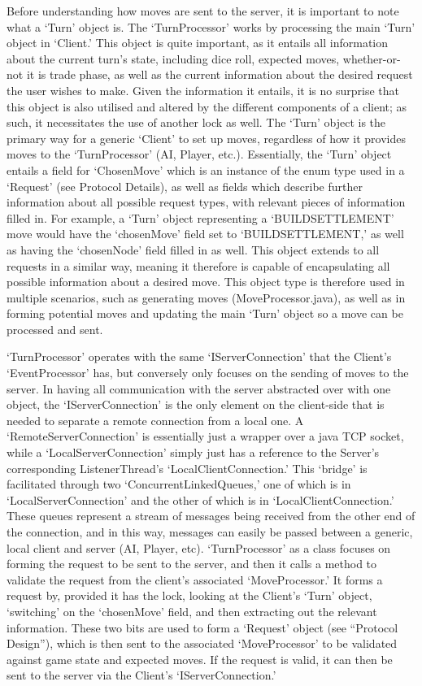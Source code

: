 \documentclass[a4paper,doc,draftfirst]{apa6}
\begin{document}
Before understanding how moves are sent to the server, it is important to note what a ‘Turn’ object is. The ‘TurnProcessor’ works by processing the main ‘Turn’ object in ‘Client.’ This object is quite important, as it entails all information about the current turn’s state, including dice roll, expected moves, whether-or-not it is trade phase, as well as the current information about the desired request the user wishes to make. Given the information it entails, it is no surprise that this object is also utilised and altered by the different components of a client; as such, it necessitates the use of another lock as well. The ‘Turn’ object is the primary way for a generic ‘Client’ to set up moves, regardless of how it provides moves to the ‘TurnProcessor’ (AI, Player, etc.). Essentially, the ‘Turn’ object entails a field for ‘ChosenMove’ which is an instance of the enum type used in a ‘Request’ (see Protocol Details), as well as fields which describe further information about all possible request types, with relevant pieces of information filled in. For example, a ‘Turn’ object representing a ‘BUILDSETTLEMENT’ move would have the ‘chosenMove’ field set to ‘BUILDSETTLEMENT,’ as well as having the ‘chosenNode’ field filled in as well. This object extends to all requests in a similar way, meaning it therefore is capable of encapsulating all possible information about a desired move. This object type is therefore used in multiple scenarios, such as generating moves (MoveProcessor.java), as well as in forming potential moves and updating the main ‘Turn’ object so a move can be processed and sent.

‘TurnProcessor’ operates with the same ‘IServerConnection’ that the Client’s ‘EventProcessor’ has, but conversely only focuses on the sending of moves to the server. In having all communication with the server abstracted over with one object, the ‘IServerConnection’ is the only element on the client-side that is needed to separate a remote connection from a local one. A ‘RemoteServerConnection’ is essentially just a wrapper over a java TCP socket, while a ‘LocalServerConnection’ simply just has a reference to the Server’s corresponding ListenerThread’s ‘LocalClientConnection.’ This ‘bridge’ is facilitated through two ‘ConcurrentLinkedQueues,’ one of which is in ‘LocalServerConnection’ and the other of which is in ‘LocalClientConnection.’ These queues represent a stream of messages being received from the other end of the connection, and in this way, messages can easily be passed between a generic, local client and server (AI, Player, etc). ‘TurnProcessor’ as a class focuses on forming the request to be sent to the server, and then it calls a method to validate the request from the client’s associated ‘MoveProcessor.’ It forms a request by, provided it has the lock, looking at the Client’s ‘Turn’ object, ‘switching’ on the ‘chosenMove’ field, and then extracting out the relevant information. These two bits are used to form a ‘Request’ object (see  “Protocol Design”), which is then sent to the associated ‘MoveProcessor’ to be validated against game state and expected moves. If the request is valid, it can then be sent to the server via the Client’s ‘IServerConnection.’
\end{document}
